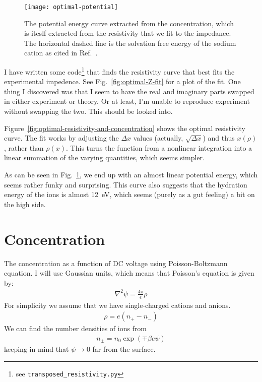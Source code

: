 \documentclass[twocolumn]{revtex4-1}
\begin{document}
\begin{figure}
  \texttt{[image: optimal-potential]}
  \caption{The potential energy curve extracted from the
    concentration, which is iteslf extracted from the resistivity that
    we fit to the impedance.  The horizontal dashed line is the
    solvation free energy of the sodium cation as cited in
    Ref.~\cite{horinek2009rational}.}\label{fig:optimal-potential}
\end{figure}

I have written some code\footnote{see \texttt{transposed\_resistivity.py}} that
finds the resistivity curve that best fits the experimental
impedence.  See Fig.~\ref{fig:optimal-Z-fit} for a plot of the fit.
One thing I discovered was that I seem to have the real and imaginary
parts swapped in either experiment or theory.  Or at least, I'm unable
to reproduce experiment without swapping the two.  This should be
looked into.

Figure~\ref{fig:optimal-resistivity-and-concentration} shows the
optimal resistivity curve.  The fit works by adjusting the $\Delta x$
values (actually, $\sqrt{\Delta x}$) and thus $x(\rho)$, rather than
$\rho(x)$.  This turns the function from a nonlinear integration into
a linear summation of the varying quantities, which seems simpler.

As can be seen in Fig.~\ref{fig:optimal-potential}, we end up with an
almost linear potential energy, which seems rather funky and
surprising.  This curve also suggests that the hydration energy of the
ions is almost 12~eV, which seems (purely as a gut feeling) a bit on
the high side.

\clearpage

\appendix

\section{Concentration}

The concentration as a function of DC voltage using Poisson-Boltzmann
equation.  I will use Gaussian units, which means that Poisson's
equation is given by:
\begin{align}
  \nabla^2 \psi = \frac{4\pi}{\epsilon} \rho
\end{align}
For simplicity we assume that we have single-charged cations and
anions.
\begin{align}
  \rho = e (n_{+} - n_{-})
\end{align}
We can find the number densities of ions from
\begin{align}
  n_{\pm} = n_0 \exp(\mp\beta e \psi)
\end{align}
keeping in mind that $\psi\rightarrow 0$ far from the surface.
\end{document}
